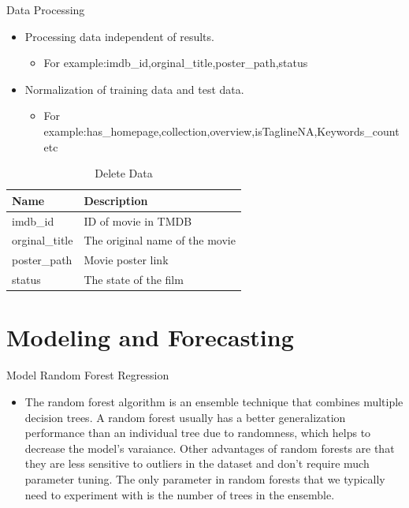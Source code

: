 \documentclass[
 size=14pt,
 paper=smartboard,  %
 mode=present, 		%
 display=slides, 	%
 style=tuliplab,  	%
 pauseslide,
 fleqn,leqno]{powerdot}
\begin{document}
\begin{slide}[toc=,bm=]{Data Processing}
  \begin{itemize}
    \item Processing data independent of results.
      \begin{itemize}
        \item For example:imdb_id,orginal_title,poster_path,status
      \end{itemize}
    \item  Normalization of training data and test data.
      \begin{itemize}
        \item For example:has_homepage,collection,overview,isTaglineNA,Keywords_count etc
      \end{itemize}
  \end{itemize}
  \begin{table}[htbp]
    \caption{Delete Data}
    \begin{tabular}{p{100pt} | p{200pt}}\toprule
     Name & Description  \\
         \midrule
         imdb_id
         & ID of movie in TMDB \\
         orginal_title
         & The original name of the movie\\
         poster_path
         & Movie poster link \\
         status
         &The state of the film \\
        \bottomrule
    \end{tabular}
   \end{table}
\end{slide}


\section{Modeling and Forecasting}


\begin{slide}[toc=,bm=]{Model}
  Random Forest Regression
\begin{itemize}
  \item The random forest algorithm is an ensemble technique that combines 
  multiple decision trees. A random forest usually has a better generalization performance than 
  an individual tree due to randomness, which helps to decrease the model’s varaiance. 
  Other advantages of random forests are that they are less sensitive to outliers 
  in the dataset and don’t require much parameter tuning. The only parameter 
  in random forests that we typically need to experiment with is the number of trees in the ensemble. 
\end{itemize}

\end{slide}
\end{document}
